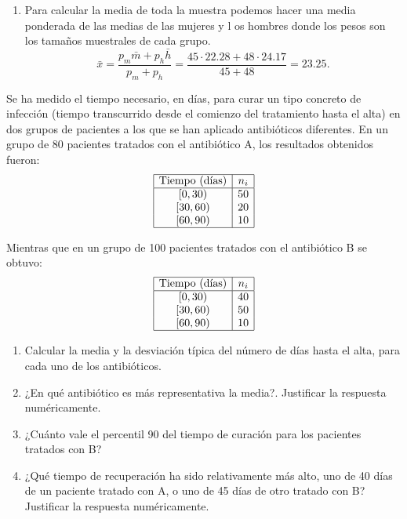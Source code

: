 {\begin{enumerate}
Así pues, ambas muestras tienen un coeficiente de variación bajo y por tanto las medias son muy representativas, pero lo es un poco más la de los hombres ya que tienen una poca menos dispersión.

\item Para calcular la media de toda la muestra podemos hacer una media ponderada de las medias de las mujeres y l
os hombres donde los pesos son los tamaños muestrales de cada grupo.
\[
\bar{x}=\frac{p_m\bar{m}+p_h\bar{h}}{p_m+p_h}=\frac{45\cdot 22.28+48\cdot 24.17}{45+48}=23.25.
\]

\end{enumerate}
}


{Se ha medido el tiempo necesario, en días, para curar un tipo concreto de infección (tiempo transcurrido desde el comienzo del tratamiento hasta el alta) en dos grupos de pacientes a los que se han aplicado antibióticos diferentes.
En un grupo de 80 pacientes tratados con el antibiótico A, los resultados obtenidos fueron:
\[
\begin{array}{|c|c|}
\hline
\mbox{Tiempo (días)} & n_i \\
\hline
{[0,30)} & 50 \\
{[30,60)} & 20 \\
{[60,90)} & 10 \\
\hline
\end{array}
\]

Mientras que en un grupo de 100 pacientes tratados con el antibiótico B se obtuvo:
\[
\begin{array}{|c|c|}
\hline
\mbox{Tiempo (días)} & n_i \\
\hline
{[0,30)} & 40 \\
{[30,60)} & 50 \\
{[60,90)} & 10 \\
\hline
\end{array}
\]

\begin{enumerate}
\item Calcular la media y la desviación típica del número de días hasta el alta, para cada uno de los antibióticos.
\item ¿En qué antibiótico es más representativa la media?. Justificar la respuesta numéricamente.
\item ¿Cuánto vale el percentil 90 del tiempo de curación para los pacientes tratados con B?
\item ¿Qué tiempo de recuperación ha sido relativamente más alto, uno de 40 días de un paciente tratado con A, o uno de 45 días de otro tratado con B? Justificar la respuesta numéricamente.
\end{enumerate}
}



